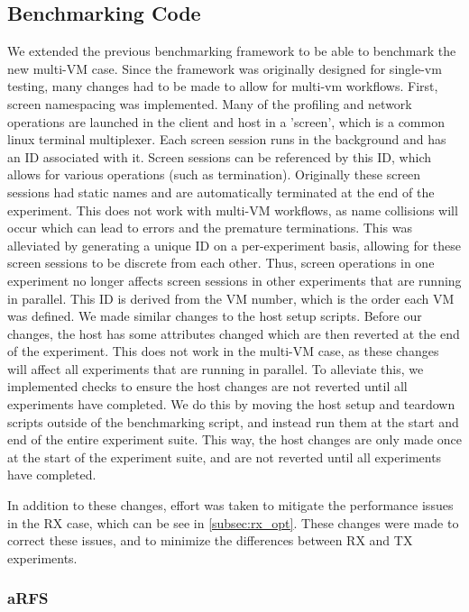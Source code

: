 \subsection{Benchmarking Code}
We extended the previous benchmarking framework to be able to benchmark the new multi-VM case. Since the framework was originally designed for single-vm testing, many changes had to be made to allow for multi-vm workflows. First, screen namespacing was implemented. Many of the profiling and network operations are launched in the client and host in a 'screen', which is a common linux terminal multiplexer. Each screen session runs in the background and has an ID associated with it. Screen sessions can be referenced by this ID, which allows for various operations (such as termination). Originally these screen sessions had static names and are automatically terminated at the end of the experiment. This does not work with multi-VM workflows, as name collisions will occur which can lead to errors and the premature terminations. This was alleviated by generating a unique ID on a per-experiment basis, allowing for these screen sessions to be discrete from each other. Thus, screen operations in one experiment no longer affects screen sessions in other experiments that are running in parallel. This ID is derived from the VM number, which is the order each VM was defined.
We made similar changes to the host setup scripts. Before our changes, the host has some attributes changed which are then reverted at the end of the experiment. This does not work in the multi-VM case, as these changes will affect all experiments that are running in parallel. To alleviate this, we implemented checks to ensure the host changes are not reverted until all experiments have completed. We do this by moving the host setup and teardown scripts outside of the benchmarking script, and instead run them at the start and end of the entire experiment suite. This way, the host changes are only made once at the start of the experiment suite, and are not reverted until all experiments have completed.

In addition to these changes, effort was taken to mitigate the performance issues in the RX case, which can be see in \ref{subsec:rx_opt}. These changes were made to correct these issues, and to minimize the differences between RX and TX experiments.

\subsubsection{aRFS}
\label{subsubsec:arfs}

